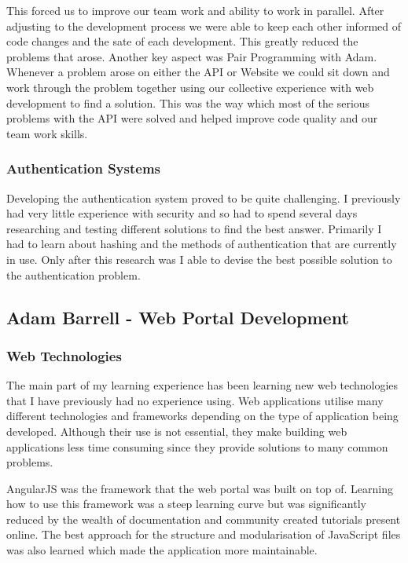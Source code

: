 \documentclass[11pt,a4paper]{report}
\begin{document}
This forced us to improve our team work and ability to work in parallel. After adjusting to the development process we were able to keep each other informed of code changes and the sate of each development. This greatly reduced the problems that arose. Another key aspect was Pair Programming with Adam. Whenever a problem arose on either the API or Website we could sit down and work through the problem together using our collective experience with web development to find a solution. This was the way which most of the serious problems with the API were solved and helped improve code quality and our team work skills.

\subsubsection{Authentication Systems}
Developing the authentication system proved to be quite challenging. I previously had very little experience with security and so had to spend several days researching and testing different solutions to find the best answer. Primarily I had to learn about hashing and the methods of authentication that are currently in use. Only after this research was I able to devise the best possible solution to the authentication problem. 

\subsection{Adam Barrell - Web Portal Development}

\subsubsection{Web Technologies}
The main part of my learning experience has been learning new web technologies that I have previously had no experience using. Web applications utilise many different technologies and frameworks depending on the type of application being developed. Although their use is not essential, they make building web applications less time consuming since they provide solutions to many common problems.

AngularJS was the framework that the web portal was built on top of. Learning how to use this framework was a steep learning curve but was significantly reduced by the wealth of documentation and community created tutorials present online. The best approach for the structure and modularisation of JavaScript files was also learned which made the application more maintainable. 
\end{document}
